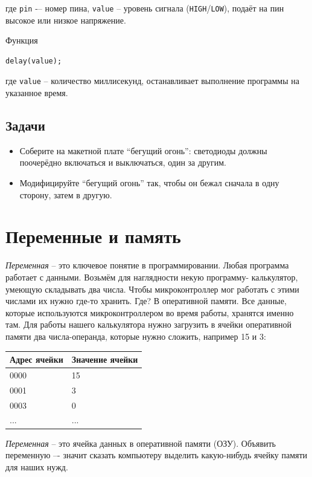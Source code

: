 \documentclass[a4paper,twoside]{book}
\begin{document}
где \texttt{pin} -– номер пина, \texttt{value} -- уровень сигнала
(\texttt{HIGH}/\texttt{LOW}), подаёт на пин высокое или низкое напряжение.

Функция
\begin{verbatim}
delay(value);
\end{verbatim}

где \texttt{value} -- количество миллисекунд, останавливает выполнение программы
на указанное время.

\subsection{Задачи}
\begin{itemize}
\item Соберите на макетной плате ``бегущий огонь'': светодиоды должны поочерёдно
  включаться и выключаться, один за другим.
\item Модифицируйте ``бегущий огонь'' так, чтобы он бежал сначала в одну
  сторону, затем в другую.
\end{itemize}

\section{Переменные и память}

\emph{Переменная} -- это ключевое понятие в программировании. Любая программа
работает с данными. Возьмём для наглядности некую программу- калькулятор,
умеющую складывать два числа. Чтобы микроконтроллер мог работать с этими числами
их нужно где-то хранить. Где? В оперативной памяти. Все данные, которые
используются микроконтроллером во время работы, хранятся именно там. Для работы
нашего калькулятора нужно загрузить в ячейки оперативной памяти два
числа-операнда, которые нужно сложить, например 15 и 3:

\begin{tabular}{p{4cm}|p{6cm}}
  Адрес ячейки & Значение ячейки \\
  \hline \hline
  0000 & 15 \\
  \hline
  0001 & 3 \\
  \hline
  0003 & 0 \\
  ... & ... \\
\end{tabular}

\emph{Переменная} -- это ячейка данных в оперативной памяти (ОЗУ). Объявить
переменную –- значит сказать компьютеру выделить какую-нибудь ячейку памяти для
наших нужд.
\end{document}
